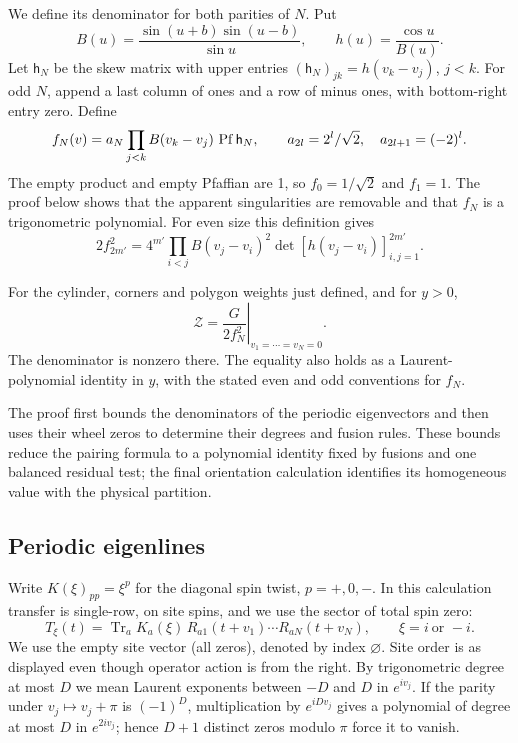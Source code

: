 We define its denominator for both parities of \(N\). Put
\[
 B(u)=\frac{\sin(u+b)\sin(u-b)}{\sin u},\qquad
 h(u)=\frac{\cos u}{B(u)}.
\]
Let \(\mathsf h_N\) be the skew matrix with upper entries
\((\mathsf h_N)_{jk}=h(v_k-v_j)\), \(j<k\). For odd \(N\), append a last column of ones and a row of minus ones, with bottom-right entry zero. Define
\[
 f_N(v)=a_N\prod_{j<k}B(v_k-v_j)\,\operatorname{Pf}\mathsf h_N,
 \qquad a_{2l}=2^l/\sqrt2,\quad a_{2l+1}=(-2)^l.
\]
The empty product and empty Pfaffian are 1, so \(f_0=1/\sqrt2\) and \(f_1=1\). The proof below shows that the apparent singularities are removable and that \(f_N\) is a trigonometric polynomial. For even size this definition gives
\[
 2f_{2m'}^2=4^{m'}\prod_{i<j}B(v_j-v_i)^2
       \det[h(v_j-v_i)]_{i,j=1}^{2m'}.
\]

\begin{proposition}\label{prop:physical-pairing}
For the cylinder, corners and polygon weights just defined, and for \(y>0\),
\[
 \mathcal Z=\left.\frac{G}{2f_N^2}\right|_{v_1=\cdots=v_N=0}.
\]
The denominator is nonzero there. The equality also holds as a Laurent-polynomial identity in \(y\), with the stated even and odd conventions for \(f_N\).
\end{proposition}

The proof first bounds the denominators of the periodic eigenvectors and then uses their wheel zeros to determine their degrees and fusion rules. These bounds reduce the pairing formula to a polynomial identity fixed by fusions and one balanced residual test; the final orientation calculation identifies its homogeneous value with the physical partition.
\subsection{Periodic eigenlines}\label{c6:subheading-04}

Write \(K(\xi)_{pp}=\xi^p\) for the diagonal spin twist, \(p=+,0,-\). In this calculation transfer is single-row, on site spins, and we use the sector of total spin zero:
\[
 T_\xi(t)=\operatorname{Tr}_a K_a(\xi)\,R_{a1}(t+v_1)\cdots R_{aN}(t+v_N),\qquad \xi=i\ \text{or }-i.
\]
We use the empty site vector (all zeros), denoted by index \(\varnothing\). Site order is as displayed even though operator action is from the right. By trigonometric degree at most \(D\) we mean Laurent exponents between \(-D\) and \(D\) in \(e^{iv_j}\). If the parity under \(v_j\mapsto v_j+\pi\) is \((-1)^D\), multiplication by \(e^{iDv_j}\) gives a polynomial of degree at most \(D\) in \(e^{2iv_j}\); hence \(D+1\) distinct zeros modulo \(\pi\) force it to vanish.

